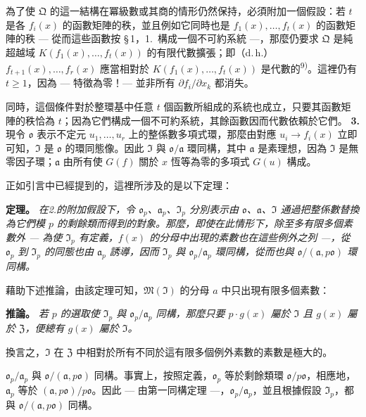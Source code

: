 \documentclass[11pt]{article}
\begin{document}
為了使 $\mathfrak{Q}$ 的這一結構在冪級數或其商的情形仍然保持，必須附加一個假設：若 $t$ 是各 $f_i(x)$ 的函數矩陣的秩，並且例如它同時也是 $f_1(x),\ldots,f_t(x)$ 的函數矩陣的秩 --- 從而這些函數按 \S\,1，1.\ 構成一個不可約系統 ---，那麼仍要求 $\mathfrak{Q}$ 是純超越域 $K(f_1(x),\ldots,f_t(x))$ 的有限代數擴張；即（d.\,h.）$f_{t+1}(x),\ldots,f_r(x)$ 應當相對於 $K(f_1(x),\ldots,f_t(x))$ 是代數的\textsuperscript{9)}。這裡仍有 $t \geq 1$，因為 --- 特徵為零！--- 並非所有 $\partial f_i/\partial x_k$ 都消失。

同時，這個條件對於整環基中任意 $t$ 個函數所組成的系統也成立，只要其函數矩陣的秩恰為 $t$；因為它們構成一個不可約系統，其餘函數因而代數依賴於它們。
\medskip\noindent\textbf{3.}
現令 $\mathfrak{o}$ 表示不定元 $u_1,\ldots,u_r$ 上的整係數多項式環，那麼由對應 $u_i \to f_i(x)$ 立即可知，$\mathfrak{I}$ 是 $\mathfrak{o}$ 的環同態像。因此 $\mathfrak{I}$ 與 $\mathfrak{o}/\mathfrak{a}$ 環同構，其中 $\mathfrak{a}$ 是素理想，因為 $\mathfrak{I}$ 是無零因子環；$\mathfrak{a}$ 由所有使 $G(f)$ 關於 $x$ 恆等為零的多項式 $G(u)$ 構成。

正如引言中已經提到的，這裡所涉及的是以下定理：

\medskip\noindent\textbf{定理。}
\textit{在2.的附加假設下，令 $\mathfrak{o}_p$、$\mathfrak{a}_p$、$\mathfrak{I}_p$ 分別表示由 $\mathfrak{o}$、$\mathfrak{a}$、$\mathfrak{I}$ 通過把整係數替換為它們模 $p$ 的剩餘類而得到的對象。那麼，即使在此情形下，除至多有限多個素數外 --- 為使 $\mathfrak{I}_p$ 有定義，$f(x)$ 的分母中出現的素數也在這些例外之列 ---，從 $\mathfrak{o}_p$ 到 $\mathfrak{I}_p$ 的同態也由 $\mathfrak{a}_p$ 誘導，因而 $\mathfrak{I}_p$ 與 $\mathfrak{o}_p/\mathfrak{a}_p$ 環同構，從而也與 $\mathfrak{o}/(\mathfrak{a}, p\mathfrak{o})$ 環同構。}

藉助下述推論，由該定理可知，$\mathfrak{M}(\mathfrak{I})$ 的分母 $a$ 中只出現有限多個素數：

\medskip\noindent\textbf{推論。}
\textit{若 $p$ 的選取使 $\mathfrak{I}_p$ 與 $\mathfrak{o}_p/\mathfrak{a}_p$ 同構，那麼只要 $p \cdot g(x)$ 屬於 $\mathfrak{I}$ 且 $g(x)$ 屬於 $\mathfrak{Z}$，便總有 $g(x)$ 屬於 $\mathfrak{I}$。}

換言之，$\mathfrak{I}$ 在 $\mathfrak{Z}$ 中相對於所有不同於這有限多個例外素數的素數是極大的。

$\mathfrak{o}_p/\mathfrak{a}_p$ 與 $\mathfrak{o}/(\mathfrak{a}, p\mathfrak{o})$ 同構。事實上，按照定義，$\mathfrak{o}_p$ 等於剩餘類環 $\mathfrak{o}/p\mathfrak{o}$，相應地，$\mathfrak{a}_p$ 等於 $(\mathfrak{a}, p\mathfrak{o})/p\mathfrak{o}$。因此 --- 由第一同構定理 ---，$\mathfrak{o}_p/\mathfrak{a}_p$，並且根據假設 $\mathfrak{I}_p$，都與 $\mathfrak{o}/(\mathfrak{a}, p\mathfrak{o})$ 同構。
\end{document}
